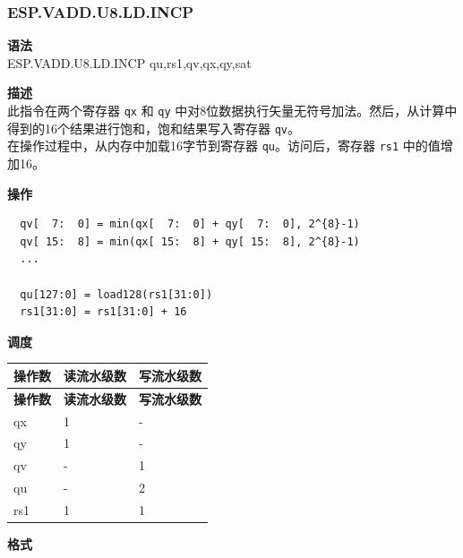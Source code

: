 \newpage

\newpage
\subsubsection{ESP.VADD.U8.LD.INCP}\label{instruction:ESPVADDU8LDINCP}
\textbf{语法}\\
ESP.VADD.U8.LD.INCP qu,rs1,qv,qx,qy,sat

\textbf{描述}\\
此指令在两个寄存器 \lstinline{qx} 和 \lstinline{qy} 中对8位数据执行矢量无符号加法。然后，从计算中得到的16个结果进行饱和，饱和结果写入寄存器 \lstinline{qv}。\\ 在操作过程中，从内存中加载16字节到寄存器 \lstinline{qu}。访问后，寄存器 \lstinline{rs1} 中的值增加16。

\textbf{操作}\\
\begin{lstlisting}
  qv[  7:  0] = min(qx[  7:  0] + qy[  7:  0], 2^{8}-1)
  qv[ 15:  8] = min(qx[ 15:  8] + qy[ 15:  8], 2^{8}-1)
  ...

  qu[127:0] = load128(rs1[31:0])
  rs1[31:0] = rs1[31:0] + 16
\end{lstlisting}


\textbf{调度}\\
\begin{longtable}[c]{|l|l|l|}
    \hline
    \rowcolor{lightgray}
    \textbf{操作数} & \textbf{读流水级数} & \textbf{写流水级数} \\\hline
    \endfirsthead
    \hline
    \rowcolor{lightgray}
     \textbf{操作数} & \textbf{读流水级数} & \textbf{写流水级数} \\\hline
    \endhead
    \hline
    \endfoot

    qx & 1 & - \\\hline
  qy & 1 & - \\\hline
     qv & - & 1 \\\hline
     qu & - & 2 \\\hline
     rs1 & 1 & 1

\end{longtable}

\textbf{格式}\\

